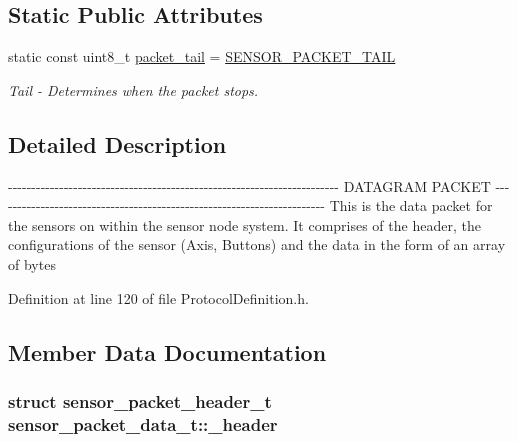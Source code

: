 \subsection*{\-Static \-Public \-Attributes}
\begin{DoxyCompactItemize}
\item 
static const uint8\-\_\-t \hyperlink{structsensor__packet__data__t_a593d9687db7d4de5d3d2e514d171d33f}{packet\-\_\-tail} = \hyperlink{_protocol_definition_8h_aba63cacf112bcb4c2ac7ffaeb1454114}{\-S\-E\-N\-S\-O\-R\-\_\-\-P\-A\-C\-K\-E\-T\-\_\-\-T\-A\-I\-L}
\begin{DoxyCompactList}\small\item\em \-Tail -\/ \-Determines when the packet stops. \end{DoxyCompactList}\end{DoxyCompactItemize}


\subsection{\-Detailed \-Description}
-\/-\/-\/-\/-\/-\/-\/-\/-\/-\/-\/-\/-\/-\/-\/-\/-\/-\/-\/-\/-\/-\/-\/-\/-\/-\/-\/-\/-\/-\/-\/-\/-\/-\/-\/-\/-\/-\/-\/-\/-\/-\/-\/-\/-\/-\/-\/-\/-\/-\/-\/-\/-\/-\/-\/-\/-\/-\/-\/-\/-\/-\/-\/-\/-\/-\/-\/-\/-\/-\/-\/ \-D\-A\-T\-A\-G\-R\-A\-M \-P\-A\-C\-K\-E\-T -\/-\/-\/-\/-\/-\/-\/-\/-\/-\/-\/-\/-\/-\/-\/-\/-\/-\/-\/-\/-\/-\/-\/-\/-\/-\/-\/-\/-\/-\/-\/-\/-\/-\/-\/-\/-\/-\/-\/-\/-\/-\/-\/-\/-\/-\/-\/-\/-\/-\/-\/-\/-\/-\/-\/-\/-\/-\/-\/-\/-\/-\/-\/-\/-\/-\/-\/-\/-\/-\/-\/ \-This is the data packet for the sensors on within the sensor node system. \-It comprises of the header, the configurations of the sensor (\-Axis, \-Buttons) and the data in the form of an array of bytes 

\-Definition at line 120 of file \-Protocol\-Definition.\-h.



\subsection{\-Member \-Data \-Documentation}
\hypertarget{structsensor__packet__data__t_a514644f179865feda63838434c236b15}{
\subsubsection[{\-\_\-header}]{\setlength{\rightskip}{0pt plus 5cm}struct {\bf sensor\-\_\-packet\-\_\-header\-\_\-t} {\bf sensor\-\_\-packet\-\_\-data\-\_\-t\-::\-\_\-header}}}\label{structsensor__packet__data__t_a514644f179865feda63838434c236b15}



